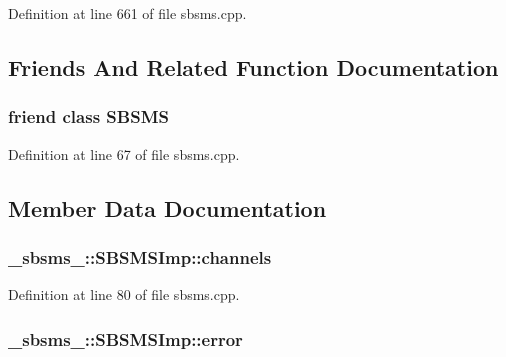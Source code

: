 Definition at line 661 of file sbsms.\+cpp.



\subsection{Friends And Related Function Documentation}
\subsubsection[{\texorpdfstring{S\+B\+S\+MS}{SBSMS}}]{\setlength{\rightskip}{0pt plus 5cm}friend class {\bf S\+B\+S\+MS}\hspace{0.3cm}{\ttfamily [friend]}}\hypertarget{class__sbsms___1_1_s_b_s_m_s_imp_a46dd97e89bc87c82bf3edfae55f98d0b}{}\label{class__sbsms___1_1_s_b_s_m_s_imp_a46dd97e89bc87c82bf3edfae55f98d0b}


Definition at line 67 of file sbsms.\+cpp.



\subsection{Member Data Documentation}
\subsubsection[{\texorpdfstring{channels}{channels}}]{ \+\_\+sbsms\+\_\+\+::\+S\+B\+S\+M\+S\+Imp\+::channels\hspace{0.3cm}{\ttfamily [protected]}}\hypertarget{class__sbsms___1_1_s_b_s_m_s_imp_abd260927c70ac1e41c4b37b3445eae69}{}\label{class__sbsms___1_1_s_b_s_m_s_imp_abd260927c70ac1e41c4b37b3445eae69}


Definition at line 80 of file sbsms.\+cpp.

\subsubsection[{\texorpdfstring{error}{error}}]{ \+\_\+sbsms\+\_\+\+::\+S\+B\+S\+M\+S\+Imp\+::error\hspace{0.3cm}{\ttfamily [protected]}}\hypertarget{class__sbsms___1_1_s_b_s_m_s_imp_a3b87b3f6e4f27a91f433a570d2af9239}{}\label{class__sbsms___1_1_s_b_s_m_s_imp_a3b87b3f6e4f27a91f433a570d2af9239}


